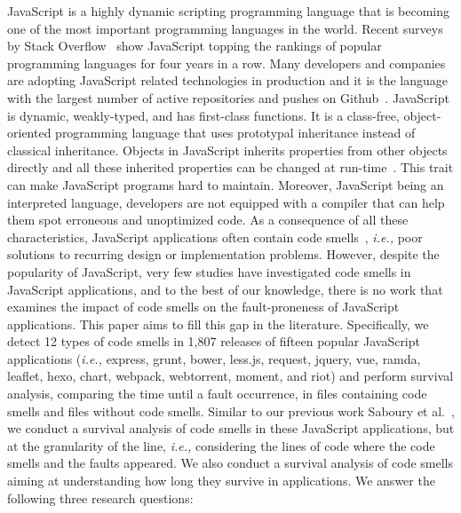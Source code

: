 \documentclass[smallcondensed]{svjour3}
\newcommand{\ie}{{\textit{i.e.,}}}
\begin{document}
JavaScript is a highly dynamic scripting programming language that is becoming one of the most important programming languages in the world. Recent surveys by Stack Overflow~\cite{so:survay2016} show JavaScript topping the rankings of popular programming languages for four years in a row. Many developers and companies are adopting JavaScript related technologies in production and it is the language with the largest number of active repositories and pushes on Github~\cite{githut}. JavaScript is dynamic, weakly-typed, and has first-class functions. It is a class-free, object-oriented programming language that uses prototypal inheritance instead of classical inheritance. Objects in JavaScript inherits properties from other objects directly and all these inherited properties can be changed at run-time~\cite{fard2013jsnose}. This trait can make JavaScript programs hard to maintain. Moreover, JavaScript being an interpreted language, developers are not equipped with a compiler that can help them spot erroneous and unoptimized code. As a consequence of all these characteristics, JavaScript applications often contain code smells~\cite{fowler1997refactoring}, \ie{} poor solutions to recurring design or implementation problems. However, despite the popularity of JavaScript, very few studies have investigated code smells in JavaScript applications, and to the best of our knowledge, there is no work that examines the impact of code smells on the fault-proneness of JavaScript applications. This paper aims to fill this gap in the literature. Specifically, we detect 12 types of code smells in 1,807 releases of fifteen popular JavaScript applications (\ie{} express, grunt, bower, less.js, request, jquery, vue, ramda, leaflet, hexo, chart, webpack, webtorrent, moment, and riot) and perform survival analysis, comparing the time until a fault occurrence, in files containing code smells and files without code smells. Similar to our previous work Saboury et al.~\cite{saboury2017empirical}, we conduct a survival analysis of code smells in these JavaScript applications, but at the granularity of the line, \ie{} considering the lines of code where the code smells and the faults appeared. We also conduct a survival analysis of code smells aiming at understanding how long they survive in applications. We answer the following three research questions:
\end{document}
